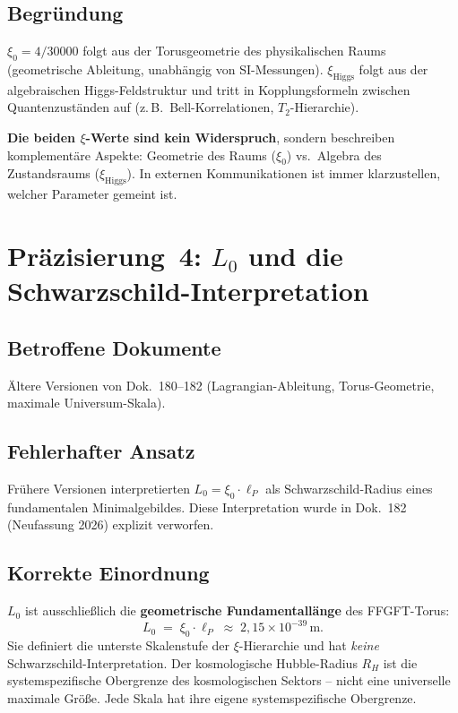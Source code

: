 \subsection*{Begründung}

$\xi_0 = 4/30000$ folgt aus der Torusgeometrie des physikalischen Raums
(geometrische Ableitung, unabhängig von SI-Messungen). $\xi_{\text{Higgs}}$
folgt aus der algebraischen Higgs-Feldstruktur und tritt in Kopplungsformeln
zwischen Quantenzuständen auf (z.\,B.\ Bell-Korrelationen, $T_2$-Hierarchie).

\textbf{Die beiden $\xi$-Werte sind kein Widerspruch}, sondern beschreiben
komplementäre Aspekte: Geometrie des Raums ($\xi_0$) vs.\ Algebra des
Zustandsraums ($\xi_{\text{Higgs}}$). In externen Kommunikationen ist immer
klarzustellen, welcher Parameter gemeint ist.

\section{\texorpdfstring{Präzisierung~4: $L_0$ und die Schwarzschild-Interpretation}{Praezisierung 4: L0 und die Schwarzschild-Interpretation}}

\subsection*{Betroffene Dokumente}

Ältere Versionen von Dok.~180--182 (Lagrangian-Ableitung, Torus-Geometrie,
maximale Universum-Skala).

\subsection*{Fehlerhafter Ansatz}

Frühere Versionen interpretierten $L_0 = \xi_0 \cdot \ell_P$ als
Schwarzschild-Radius eines fundamentalen Minimalgebildes. Diese
Interpretation wurde in Dok.~182 (Neufassung 2026) explizit verworfen.

\subsection*{Korrekte Einordnung}

$L_0$ ist ausschließlich die \textbf{geometrische Fundamentallänge} des
FFGFT-Torus:
\begin{equation}
  L_0 \;=\; \xi_0 \cdot \ell_P \;\approx\; 2{,}15 \times 10^{-39}\,\text{m}.
  \tag{190.10}
\end{equation}
Sie definiert die unterste Skalenstufe der $\xi$-Hierarchie und hat
\emph{keine} Schwarzschild-Interpretation. Der kosmologische Hubble-Radius
$R_H$ ist die systemspezifische Obergrenze des kosmologischen Sektors --
nicht eine universelle maximale Größe. Jede Skala hat ihre eigene
systemspezifische Obergrenze.

